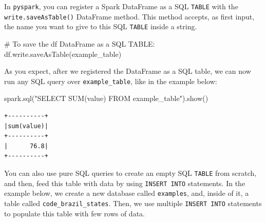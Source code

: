 \documentclass[
  11pt,
  letterpaper,
  DIV=11,
  numbers=noendperiod]{scrreprt}
\newenvironment{Shaded}{\begin{snugshade}}{\end{snugshade}}
\newcommand{\CommentTok}[1]{\textcolor[rgb]{0.37,0.37,0.37}{#1}}
\newcommand{\NormalTok}[1]{\textcolor[rgb]{0.00,0.23,0.31}{#1}}
\newcommand{\StringTok}[1]{\textcolor[rgb]{0.13,0.47,0.30}{#1}}
\begin{document}
In \texttt{pyspark}, you can register a Spark DataFrame as a SQL
\texttt{TABLE} with the \texttt{write.saveAsTable()} DataFrame method.
This method accepts, as first input, the name you want to give to this
SQL \texttt{TABLE} inside a string.

\begin{Shaded}
\begin{Highlighting}[]
\CommentTok{\# To save the \textasciigrave{}df\textasciigrave{} DataFrame as a SQL TABLE:}
\NormalTok{df.write.saveAsTable(}\StringTok{\textquotesingle{}example\_table\textquotesingle{}}\NormalTok{)}
\end{Highlighting}
\end{Shaded}

As you expect, after we registered the DataFrame as a SQL table, we can
now run any SQL query over \texttt{example\_table}, like in the example
below:

\begin{Shaded}
\begin{Highlighting}[]
\NormalTok{spark.sql(}\StringTok{"SELECT SUM(value) FROM example\_table"}\NormalTok{).show()}
\end{Highlighting}
\end{Shaded}

\begin{verbatim}
+----------+
|sum(value)|
+----------+
|      76.8|
+----------+
\end{verbatim}

You can also use pure SQL queries to create an empty SQL \texttt{TABLE}
from scratch, and then, feed this table with data by using
\texttt{INSERT\ INTO} statements. In the example below, we create a new
database called \texttt{examples}, and, inside of it, a table called
\texttt{code\_brazil\_states}. Then, we use multiple
\texttt{INSERT\ INTO} statements to populate this table with few rows of
data.
\end{document}

